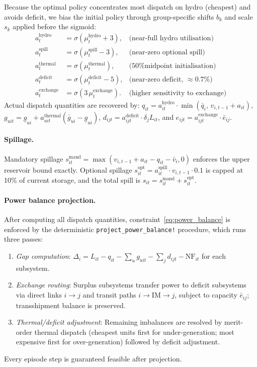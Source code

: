 \documentclass[11pt,letterpaper]{article}
\begin{document}
Because the optimal policy concentrates most dispatch on hydro (cheapest) and
avoids deficit, we bias the initial policy through group-specific shifts $b_k$
and scale $s_k$ applied before the sigmoid:
\begin{align}
  a^{\mathrm{hydro}}_t   &= \sigma(\mu^{\mathrm{hydro}}_t + 3),
    &\text{(near-full hydro utilisation)} \label{eq:hydro_shift}\\
  a^{\mathrm{spill}}_t   &= \sigma(\mu^{\mathrm{spill}}_t - 3),
    &\text{(near-zero optional spill)} \\
  a^{\mathrm{thermal}}_t &= \sigma(\mu^{\mathrm{thermal}}_t),
    &\text{(50\% midpoint initialisation)} \\
  a^{\mathrm{deficit}}_t &= \sigma(\mu^{\mathrm{deficit}}_t - 5),
    &\text{(near-zero deficit, $\approx 0.7\%$)} \\
  a^{\mathrm{exchange}}_t &= \sigma(3\,\mu^{\mathrm{exchange}}_t).
    &\text{(higher sensitivity to exchange)}
\end{align}
Actual dispatch quantities are recovered by:
$q_{it} = a^{\mathrm{hydro}}_{it} \cdot \min(\bar{q}_i,\, v_{i,t-1} + a_{it})$,
$g_{uit} = \underline{g}_{ui} + a^{\mathrm{thermal}}_{uit}(\bar{g}_{ui}-\underline{g}_{ui})$,
$d_{ijt} = a^{\mathrm{deficit}}_{ijt} \cdot \delta_j L_{it}$, and
$e_{ijt} = a^{\mathrm{exchange}}_{ijt} \cdot \bar{e}_{ij}$.

\paragraph{Spillage.}
Mandatory spillage $s^{\mathrm{mand}}_{it} = \max(v_{i,t-1} + a_{it} - q_{it} - \bar{v}_i, 0)$
enforces the upper reservoir bound exactly.  Optional spillage
$s^{\mathrm{opt}}_{it} = a^{\mathrm{spill}}_{it} \cdot v_{i,t-1} \cdot 0.1$
is capped at 10\% of current storage, and the total spill is
$s_{it} = s^{\mathrm{mand}}_{it} + s^{\mathrm{opt}}_{it}$.

\paragraph{Power balance projection.}
After computing all dispatch quantities, constraint~\eqref{eq:power_balance} is
enforced by the deterministic \texttt{project\_power\_balance!} procedure, which
runs three passes:
\begin{enumerate}[label=(\roman*),noitemsep]
  \item \emph{Gap computation}: $\Delta_i = L_{it} - q_{it} - \sum_u g_{uit} -
        \sum_j d_{ijt} - \mathrm{NF}_{it}$ for each subsystem.
  \item \emph{Exchange routing}: Surplus subsystems transfer power to deficit
        subsystems via direct links $i \to j$ and transit paths $i \to \mathrm{IM} \to j$,
        subject to capacity $\bar{e}_{ij}$; transshipment balance is preserved.
  \item \emph{Thermal/deficit adjustment}: Remaining imbalances are resolved by
        merit-order thermal dispatch (cheapest units first for under-generation;
        most expensive first for over-generation) followed by deficit adjustment.
\end{enumerate}
Every episode step is guaranteed feasible after projection.
\end{document}
